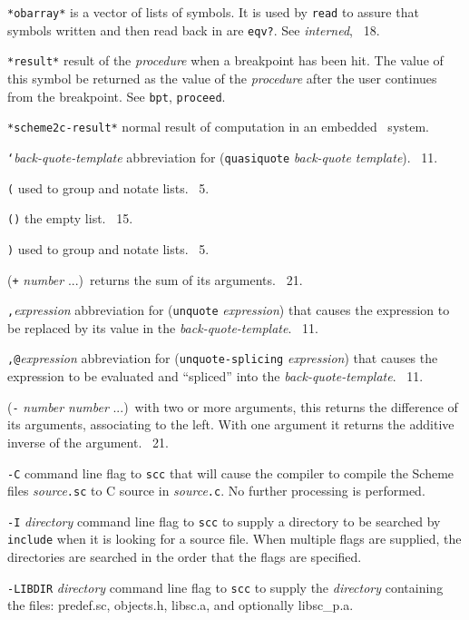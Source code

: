 \documentclass[10pt,twocolumn]{article}
\begin{document}
\texttt{*obarray*} is a vector of lists of symbols.  It is used by
\texttt{read} to assure that symbols written and then read back in are
\texttt{eqv?}.  See \emph{interned}, \RRRRRS~18.

\texttt{*result*} result of the \emph{procedure} when a breakpoint has
been hit.  The value of this symbol be returned as the value of the
\emph{procedure} after the user continues from the breakpoint.  See
\texttt{bpt}, \texttt{proceed}.

\texttt{*scheme2c-result*} normal result of computation in an embedded
\StoC\ system.

\texttt{`}\emph{back-quote-template} abbreviation for
(\texttt{quasiquote} \emph{back-quote template}). \RRRRRS~11.

\texttt{(} used to group and notate lists.  \RRRRRS~5.

\texttt{()} the empty list.  \RRRRRS~15.

\texttt{)} used to group and notate lists.  \RRRRRS~5.

(\texttt{+} \emph{number} ...)\ returns the sum of its arguments.
\RRRRRS~21.

\texttt{,}\emph{expression} abbreviation for (\texttt{unquote}
\emph{expression}) that causes the expression to be replaced by its
value in the \emph{back-quote-template}.  \RRRRRS~11.

\texttt{,@}\emph{expression} abbreviation for
(\texttt{unquote-splicing} \emph{expression}) that causes the
expression to be evaluated and ``spliced'' into the
\emph{back-quote-template}. \RRRRRS~11.

(\texttt{-} \emph{number} \emph{number} ...)\ with two or more
arguments, this returns the difference of its arguments, associating
to the left.  With one argument it returns the additive inverse of the
argument.  \RRRRRS~21.

\texttt{-C} command line flag to \texttt{scc} that will cause the
compiler to compile the Scheme files \emph{source}\texttt{.sc} to C
source in \emph{source}\texttt{.c}.  No further processing is
performed.

\texttt{-I} \emph{directory} command line flag to \texttt{scc} to
supply a directory to be searched by \texttt{include} when it is
looking for a source file.  When multiple flags are supplied, the
directories are searched in the order that the flags are specified.

\texttt{-LIBDIR} \emph{directory} command line flag to \texttt{scc} to
supply the \emph{directory} containing the files: predef.sc,
objects.h, libsc.a, and optionally libsc\_p.a.
\end{document}
